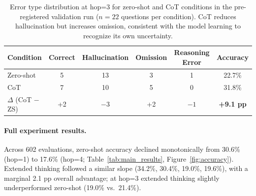 \documentclass{article}
\begin{document}
\begin{table}[t]
\centering
\caption{Error type distribution at hop=3 for zero-shot and CoT conditions
in the pre-registered validation run ($n=22$ questions per condition).
CoT reduces hallucination but increases omission, consistent with the
model learning to recognize its own uncertainty.}
\label{tab:hop3_prelim}
\small
\begin{tabular}{@{}lccccc@{}}
\toprule
\textbf{Condition} & \textbf{Correct} & \textbf{Hallucination} & \textbf{Omission} & \textbf{Reasoning Error} & \textbf{Accuracy} \\
\midrule
Zero-shot  & 5  & 13 & 3 & 1 & 22.7\% \\
CoT        & 7  & 10 & 5 & 0 & 31.8\% \\
\midrule
$\Delta$ (CoT $-$ ZS) & +2 & $-3$ & +2 & $-1$ & \textbf{+9.1 pp} \\
\bottomrule
\end{tabular}
\end{table}

\paragraph{Full experiment results.}
Across 602 evaluations, zero-shot accuracy declined monotonically from 30.6\% (hop=1) to 17.6\% (hop=4; Table~\ref{tab:main_results}, Figure~\ref{fig:accuracy}). Extended thinking followed a similar slope (34.2\%, 30.4\%, 19.0\%, 19.6\%), with a marginal 2.1 pp overall advantage; at hop=3 extended thinking slightly underperformed zero-shot (19.0\% vs.\ 21.4\%).
\end{document}
